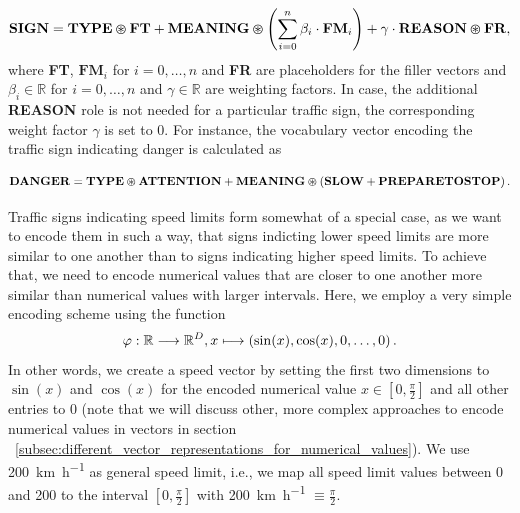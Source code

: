 \begin{equation}
    \label{eq:semantic_vocab_traffic_signs}
    \mathbf{SIGN} = \mathbf{TYPE} \varoast \mathbf{FT} + \mathbf{MEANING} \varoast \left( \sum\limits_{i=0}^{n} \beta_{i} \cdot  \mathbf{FM}_{i}  \right) + \gamma \cdot \mathbf{REASON} \varoast \mathbf{FR}, 
\end{equation}
where \textbf{FT}, $\mathbf{FM}_{i}$ for $i = 0, \ldots, n$ and \textbf{FR} are placeholders for the filler vectors and $\beta_{i} \in \mathbb{R} $ for $i = 0, \ldots, n$ and $\gamma \in \mathbb{R} $ are weighting factors.
In case, the additional \textbf{REASON} role is not needed for a particular traffic sign, the corresponding weight factor $\gamma$ is set to \num{0}.
For instance, the vocabulary vector encoding the traffic sign indicating danger is calculated as

\begin{equation}
\label{eq:semantic_vocab_traffic_sign_example}
\mathbf{DANGER} = \mathbf{TYPE} \varoast \mathbf{ATTENTION} + \mathbf{MEANING} \varoast  \left(\mathbf{SLOW} + \mathbf{PREPARETOSTOP}\right).
\end{equation}

Traffic signs indicating speed limits form somewhat of a special case, as we want to encode them in such a way, that signs indicting lower speed limits are more similar to one another than to signs indicating higher speed limits.
To achieve that, we need to encode numerical values that are closer to one another more similar than numerical values with larger intervals.
Here, we employ a very simple encoding scheme using the function 
\begin{equation}
\label{eq:cosin_vec_func}
\varphi: \mathbb{R} \longrightarrow \mathbb{R}^{D}, x \longmapsto \left(\sin(x), \cos(x), 0, \ldots, 0\right).
\end{equation}
In other words, we create a speed vector by setting the first two dimensions to $\sin(x)$ and $\cos(x)$ for the encoded numerical value $x \in [0,\frac{\pi}{2}]$ and all other entries to \num{0} (note that we will discuss other, more complex approaches to encode numerical values in vectors in section ~\ref{subsec:different_vector_representations_for_numerical_values}).
We use \SI[per-mode=symbol]{200}{\kilo\meter\per\hour} as general speed limit, i.e., we map all speed limit values between \num{0} and \num{200} to the interval $\left[0, \frac{\pi}{2}\right]$ with \SI[per-mode=symbol]{200}{\kilo\meter\per\hour} $\equiv \frac{\pi}{2}$.

